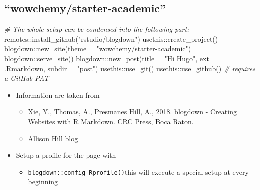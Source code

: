 \documentclass[
]{article}
\newenvironment{Shaded}{\begin{snugshade}}{\end{snugshade}}
\newcommand{\AttributeTok}[1]{\textcolor[rgb]{0.77,0.63,0.00}{#1}}
\newcommand{\CommentTok}[1]{\textcolor[rgb]{0.56,0.35,0.01}{\textit{#1}}}
\newcommand{\FunctionTok}[1]{\textcolor[rgb]{0.00,0.00,0.00}{#1}}
\newcommand{\NormalTok}[1]{#1}
\newcommand{\SpecialCharTok}[1]{\textcolor[rgb]{0.00,0.00,0.00}{#1}}
\newcommand{\StringTok}[1]{\textcolor[rgb]{0.31,0.60,0.02}{#1}}
\providecommand{\tightlist}{%
  \setlength{\itemsep}{0pt}\setlength{\parskip}{0pt}}
\begin{document}
\hypertarget{wowchemystarter-academic-1}{%
\subsection{``wowchemy/starter-academic''}\label{wowchemystarter-academic-1}}

\begin{Shaded}
\begin{Highlighting}[]

\CommentTok{\# The whole setup can be condensed into the following part:}
\NormalTok{remotes}\SpecialCharTok{::}\FunctionTok{install\_github}\NormalTok{(}\StringTok{"rstudio/blogdown"}\NormalTok{)}
\NormalTok{usethis}\SpecialCharTok{::}\FunctionTok{create\_project}\NormalTok{()}
\NormalTok{blogdown}\SpecialCharTok{::}\FunctionTok{new\_site}\NormalTok{(}\AttributeTok{theme =} \StringTok{"wowchemy/starter{-}academic"}\NormalTok{)}
\NormalTok{blogdown}\SpecialCharTok{::}\FunctionTok{serve\_site}\NormalTok{()}
\NormalTok{blogdown}\SpecialCharTok{::}\FunctionTok{new\_post}\NormalTok{(}\AttributeTok{title =} \StringTok{"Hi Hugo"}\NormalTok{, }
                     \AttributeTok{ext =} \StringTok{\textquotesingle{}.Rmarkdown\textquotesingle{}}\NormalTok{, }
                     \AttributeTok{subdir =} \StringTok{"post"}\NormalTok{)}
\NormalTok{usethis}\SpecialCharTok{::}\FunctionTok{use\_git}\NormalTok{()}
\NormalTok{usethis}\SpecialCharTok{::}\FunctionTok{use\_github}\NormalTok{() }\CommentTok{\# requires a GitHub PAT}
\end{Highlighting}
\end{Shaded}

\begin{itemize}
\item
  Information are taken from

  \begin{itemize}
  \tightlist
  \item
    Xie, Y., Thomas, A., Presmanes Hill, A., 2018. blogdown -
    Creating Websites with R Markdown. CRC Press, Boca Raton.
  \item
    \href{https://alison.rbind.io/post/new-year-new-blogdown/\#pre-requisites}{Allison Hill
    blog}
  \end{itemize}
\item
  Setup a profile for the page with

  \begin{itemize}
  \tightlist
  \item
    \texttt{blogdown::config\_Rprofile()}this will execute a special setup
    at every beginning
  \end{itemize}
\end{itemize}
\end{document}
